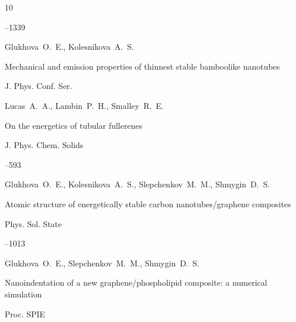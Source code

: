 \begin{thebibliography}{10}

--1339







\by Glukhova~O.~E., Kolesnikova~A.~S.

\paper Mechanical and emission properties of thinnest stable bamboolike nanotubes

\jour J. Phys. Conf. Ser.










\by Lucas~A.~A., Lambin~P.~H., Smalley~R.~E.

\paper On the energetics of tubular fullerenes

\jour J. Phys. Chem. Solids




--593





\by Glukhova~O.~E., Kolesnikova~A.~S., Slepchenkov~M.~M., Shmygin~D.~S.

\paper Atomic structure of energetically stable carbon nanotubes/graphene composites

\jour Phys. Sol. State




--1013





\by Glukhova~O.~E., Slepchenkov~M.~M., Shmygin~D.~S.

\paper Nanoindentation of a new graphene/phospholipid composite: a numerical simulation

\jour Proc. SPIE 


\end{thebibliography}
